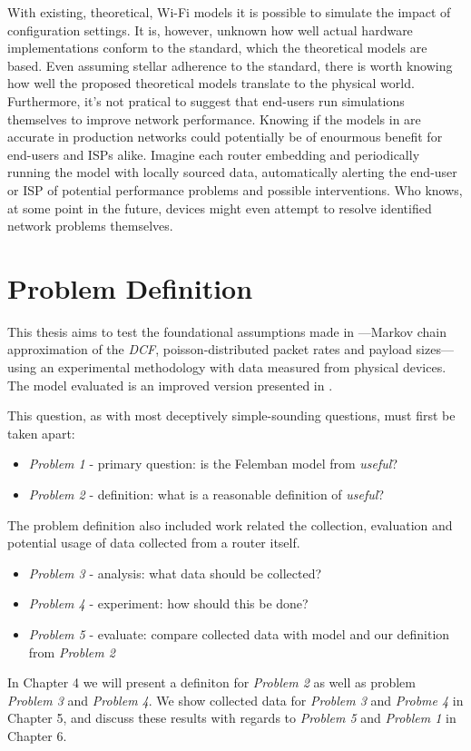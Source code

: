 With existing, theoretical, Wi-Fi models it is possible to simulate the impact
of configuration settings. It is, however, unknown how well actual hardware
implementations conform to the standard, which the theoretical models are
based. Even assuming stellar adherence to the standard, there is worth knowing
how well the proposed theoretical models translate to the physical world.
Furthermore, it's not pratical to suggest that end-users run simulations
themselves to improve network performance. Knowing if the models in
\cite{felemban} are accurate in production networks could potentially be of
enourmous benefit for end-users and ISPs alike. Imagine each router embedding
and periodically running the model with locally sourced data, automatically
alerting the end-user or ISP of potential performance problems and possible
interventions. Who knows, at some point in the future, devices might even
attempt to resolve identified network problems themselves.

\section{Problem Definition}

This thesis aims to test the foundational assumptions made in
\cite{bianchi}—Markov chain approximation of the \emph{DCF},
poisson-distributed packet rates and payload sizes—using an experimental
methodology with data measured from physical devices. The model evaluated is
an improved version presented in \cite{felemban}.

This question, as with most deceptively simple-sounding questions, must first
be taken apart:

\begin{itemize}
\item \emph{Problem 1} - primary question: is the Felemban model from \cite{felemban} \emph{useful}?
\item \emph{Problem 2} - definition: what is a reasonable definition of \emph{useful}?
\end{itemize}

The problem definition also included work related the collection, evaluation
and potential usage of data collected from a router itself.

\begin{itemize}
\item \emph{Problem 3} - analysis: what data should be collected?
\item \emph{Problem 4} - experiment: how should this be done?
\item \emph{Problem 5} - evaluate: compare collected data with model and our definition from \emph{Problem 2}
\end{itemize}

In Chapter 4 we will present a definiton for \emph{Problem 2} as well as
problem \emph{Problem 3} and \emph{Problem 4}. We show collected data for
\emph{Problem 3} and \emph{Probme 4} in Chapter 5, and discuss these results
with regards to \emph{Problem 5} and \emph{Problem 1} in Chapter 6.

